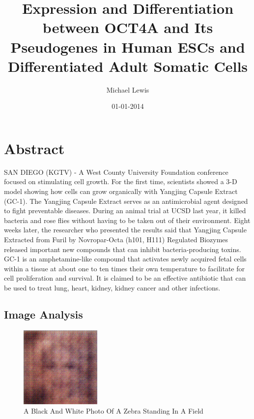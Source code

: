 \documentclass{article}%
\title{Expression and Differentiation between OCT4A and Its Pseudogenes in Human ESCs and Differentiated Adult Somatic Cells}%
\author{Michael Lewis}%
\affil{Department of Cardiology, Zhongda Hospital, Medical School of Southeast University, Nanjing, Jiangsu, China}%
\date{01{-}01{-}2014}%
\begin{document}
%
\normalsize%
\maketitle%
\section{Abstract}%
\label{sec:Abstract}%
SAN DIEGO (KGTV) {-} A West County University Foundation conference focused on stimulating cell growth. For the first time, scientists showed a 3{-}D model showing how cells can grow organically with Yangjing Capsule Extract (GC{-}1).\newline%
The Yangjing Capsule Extract serves as an antimicrobial agent designed to fight preventable diseases.\newline%
During an animal trial at UCSD last year, it killed bacteria and rose flies without having to be taken out of their environment. Eight weeks later, the researcher who presented the results said that Yangjing Capsule Extracted from Furil by Novropar{-}Octa (h101, H111) Regulated Biozymes released important new compounds that can inhibit bacteria{-}producing toxins.\newline%
GC{-}1 is an amphetamine{-}like compound that activates newly acquired fetal cells within a tissue at about one to ten times their own temperature to facilitate for cell proliferation and survival. It is claimed to be an effective antibiotic that can be used to treat lung, heart, kidney, kidney cancer and other infections.

%
\subsection{Image Analysis}%
\label{subsec:ImageAnalysis}%


\begin{figure}[h!]%
\centering%
\includegraphics[width=150px]{500_fake_images/samples_5_194.png}%
\caption{A Black And White Photo Of A Zebra Standing In A Field}%
\end{figure}

%
\end{document}
